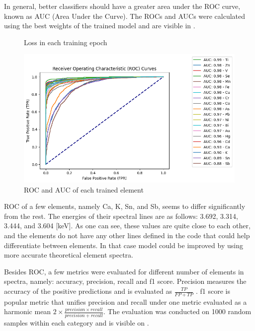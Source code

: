 In general, better classifiers should have a greater area under the ROC curve, known as AUC (Area Under the Curve). 
The ROCs and AUCs were calculated using the best weights of the trained model and are visible in .

\begin{figure}[htbp!]
  \centering
  
  \caption{Loss in each training epoch}
  \label{fig:vit-loss}
\end{figure}

\begin{figure}[htbp!]
  \centering
  \includegraphics[width=1\textwidth]{img/roc_auc.png}
  \caption{ROC and AUC of each trained element}
  \label{fig:roc-auc}
\end{figure}

ROC of a few elements, namely Ca, K, Sn, and Sb, seems to differ significantly from the rest. 
The energies of their spectral lines are as follows: 3.692, 3.314, 3.444, and 3.604 [keV]. 
As one can see, these values are quite close to each other, and the elements do not have any other lines defined in the code that could help differentiate between elements.
In that case model could be improved by using more accurate theoretical element spectra. 

Besides ROC, a few metrics were evaluated for different number of elements in spectra, namely: accuracy, precision, recall and f1 score. 
Precision measures the accuracy of the positive predictions and is evaluated as $\frac{TP}{FP+TP}$ .
f1 score is popular metric that unifies precision and recall under one metric evaluated as a harmonic mean  $2\times\frac{precision \times recall}{precision + recall}$.
The evaluation was conducted on 1000 random samples within each category and is visible on .

